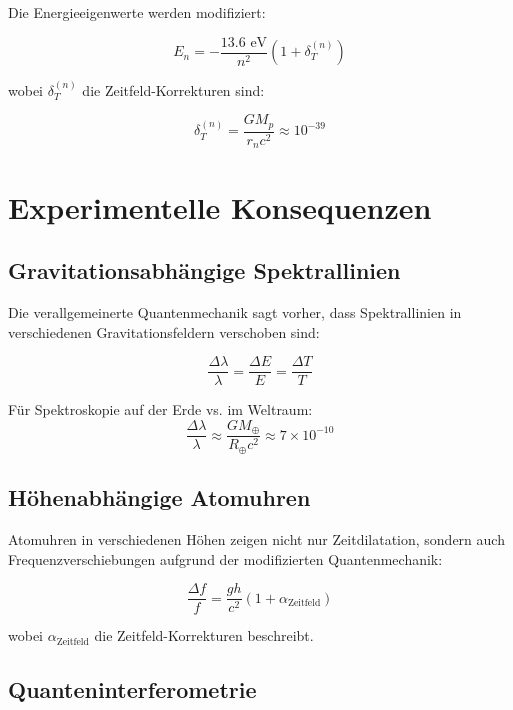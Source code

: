 \documentclass[12pt,a4paper]{report}
\begin{document}
Die Energieeigenwerte werden modifiziert:

\begin{equation}
	E_n = -\frac{13.6 \text{ eV}}{n^2}\left(1 + \delta_T^{(n)}\right)
\end{equation}

wobei $\delta_T^{(n)}$ die Zeitfeld-Korrekturen sind:

\begin{equation}
	\delta_T^{(n)} = \frac{GM_p}{r_n c^2} \approx 10^{-39}
\end{equation}

\section{Experimentelle Konsequenzen}

\subsection{Gravitationsabhängige Spektrallinien}

Die verallgemeinerte Quantenmechanik sagt vorher, dass Spektrallinien in verschiedenen Gravitationsfeldern verschoben sind:

\begin{equation}
	\frac{\Delta\lambda}{\lambda} = \frac{\Delta E}{E} = \frac{\Delta T}{T}
\end{equation}

Für Spektroskopie auf der Erde vs. im Weltraum:
\begin{equation}
	\frac{\Delta\lambda}{\lambda} \approx \frac{GM_\oplus}{R_\oplus c^2} \approx 7 \times 10^{-10}
\end{equation}

\subsection{Höhenabhängige Atomuhren}

Atomuhren in verschiedenen Höhen zeigen nicht nur Zeitdilatation, sondern auch Frequenzverschiebungen aufgrund der modifizierten Quantenmechanik:

\begin{equation}
	\frac{\Delta f}{f} = \frac{gh}{c^2}\left(1 + \alpha_{\text{Zeitfeld}}\right)
\end{equation}

wobei $\alpha_{\text{Zeitfeld}}$ die Zeitfeld-Korrekturen beschreibt.

\subsection{Quanteninterferometrie}
\end{document}
